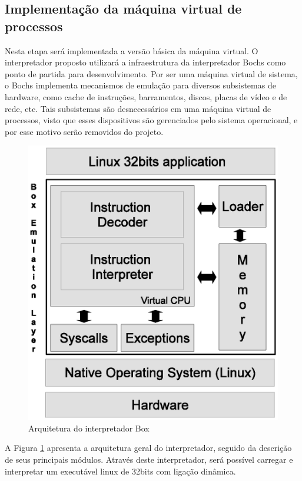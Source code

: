 \documentclass[11pt,twoside]{article}
\begin{document}
\subsection{Implementação da máquina virtual de processos}

Nesta etapa será implementada a versão básica da máquina virtual.
O interpretador proposto utilizará a infraestrutura da interpretador Bochs como ponto de partida para desenvolvimento. 
Por ser uma máquina virtual de sistema, o Bochs implementa mecanismos de emulação para diversos subsistemas de hardware, como cache de instruções, barramentos, discos, placas de vídeo e de rede, etc.
Tais subsistemas são desnecessários em uma máquina virtual de processos, visto que esses dispositivos são gerenciados pelo sistema operacional, e por esse motivo serão removidos do projeto.

\begin{figure}[h]
 \centering
 \includegraphics[width=0.5\columnwidth]{./figures/box-architecture.eps}
 \caption{Arquitetura do interpretador Box}
 \label{fig:box-architecture}
\end{figure}

A Figura \ref{fig:box-architecture} apresenta a arquitetura geral do interpretador, seguido da descrição de seus principais módulos.
Através deste interpretador, será possível carregar e interpretar um executável linux de 32bits com ligação dinâmica.
\end{document}
